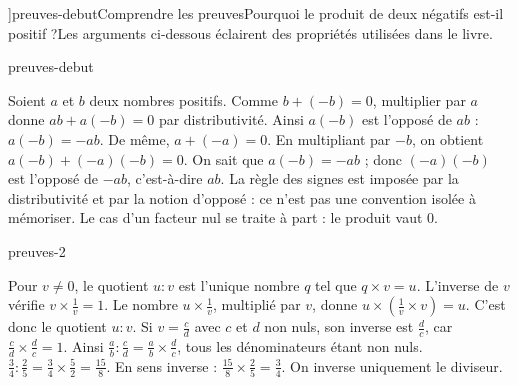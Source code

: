 \editionPage[\pdfbookmark[0]{Démonstrations}{bm-preuves-debut-parent}]{preuves-debut}{Comprendre les preuves}{Pourquoi le produit de deux négatifs est-il positif ?}{Les arguments ci-dessous éclairent des propriétés utilisées dans le livre.}
\begin{blocEdition}{preuves-debut}

Soient $a$ et $b$ deux nombres positifs. Comme $b+(-b)=0$, multiplier par $a$ donne $ab+a(-b)=0$ par distributivité. Ainsi $a(-b)$ est l’opposé de $ab$ : $a(-b)=-ab$.
De même, $a+(-a)=0$. En multipliant par $-b$, on obtient $a(-b)+(-a)(-b)=0$. On sait que $a(-b)=-ab$ ; donc $(-a)(-b)$ est l’opposé de $-ab$, c’est-à-dire $ab$.
La règle des signes est imposée par la distributivité et par la notion d’opposé : ce n’est pas une convention isolée à mémoriser. Le cas d’un facteur nul se traite à part : le produit vaut 0.
\end{blocEdition}
\begin{blocEdition}{preuves-2}

Pour $v\ne0$, le quotient $u:v$ est l’unique nombre $q$ tel que $q\times v=u$.
L’inverse de $v$ vérifie $v\times\frac1v=1$. Le nombre $u\times\frac1v$, multiplié par $v$, donne $u\times\left(\frac1v\times v\right)=u$. C’est donc le quotient $u:v$.
Si $v=\frac cd$ avec $c$ et $d$ non nuls, son inverse est $\frac dc$, car $\frac cd\times\frac dc=1$. Ainsi $\frac ab:\frac cd=\frac ab\times\frac dc$, tous les dénominateurs étant non nuls.
$\frac34:\frac25=\frac34\times\frac52=\frac{15}{8}$. En sens inverse : $\frac{15}{8}\times\frac25=\frac34$. On inverse uniquement le diviseur.
\end{blocEdition}
